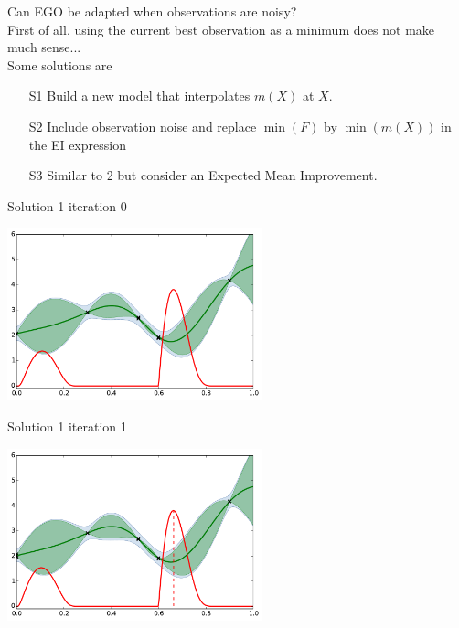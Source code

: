 \documentclass{beamer}
\begin{document}
\begin{frame}{}
Can EGO be adapted when observations are noisy?\\
\vspace{5mm}
First of all, using the current best observation as a minimum does not make much sense...\\
\vspace{5mm}
Some solutions are
\begin{itemize}
	\item[S1] Build a new model that interpolates $m(X)$ at $X$. 
	\item[S2] Include observation noise and replace $\min(F)$ by $\min(m(X))$ in the EI expression
	\item[S3] Similar to 2 but consider an Expected Mean Improvement.
\end{itemize}
\end{frame}

\begin{frame}{Solution 1}
iteration 0
\begin{center}
\includegraphics[height=5cm]{figures/python/ego_EI1n0}
\end{center}
\end{frame}

\begin{frame}[noframenumbering]{Solution 1}
iteration 1
\begin{center}
\includegraphics[height=5cm]{figures/python/ego_EI1n1}
\end{center}
\end{frame}
\end{document}
